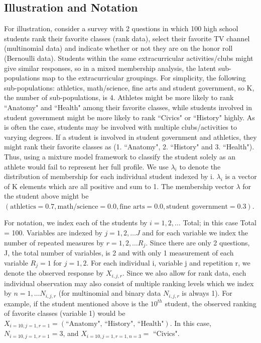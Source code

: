 \documentclass{article}\usepackage[]{graphicx}\usepackage[]{color}
\begin{document}
\subsection{Illustration and Notation}
For illustration, consider a survey with 2 questions in which 100 high school students rank their favorite classes (rank data), select their favorite TV channel (multinomial data) and indicate whether or not they are on the honor roll (Bernoulli data). Students within the same extracurricular activities/clubs might give similar responses, so in a mixed membership analysis, the latent sub-populations map to the extracurricular groupings. For simplicity, the following sub-populations: athletics, math/science, fine arts and student government, so K, the number of sub-populations, is 4. Athletes might be more likely to rank ``Anatomy" and ``Health" among their favorite classes, while students involved in student government might be more likely to rank ``Civics" or ``History" highly.  As is often the case, students may be involved with multiple clubs/activities to varying degrees. If a student is involved in student government and athletics, they might rank their favorite classes as (1. ``Anatomy", 2. ``History" and 3. ``Health"). Thus, using a mixture model framework to classify the student solely as an athlete would fail to represent her full profile. We use $\lambda_i$ to denote the distribution of membership for each individual student indexed by i. $\lambda_i$ is a vector of K elements which are all positive and sum to 1. The membership vector $\lambda$ for the student above might be $\left(\text{athletics} = 0.7, \text{math/science} = 0.0, \text{fine arts} = 0.0, \text{student government} = 0.3\right)$.

For notation, we index each of the students by $i = 1,2, \ldots$ Total; in this case Total = 100. Variables are indexed by $j = 1,2,\ldots J$ and for each variable we index the number of repeated measures by $r = 1,2,\ldots R_j$. Since there are only 2 questions, J, the total number of variables, is 2 and with only 1 measurement of each variable $R_j = 1$ for $j = 1,2$. For each individual i, variable j and repetition r, we denote the observed response by $X_{i,j,r}$. Since we also allow for rank data, each individual observation may also consist of multiple ranking levels which we index by $n = 1, \ldots N_{i,j,r}$ (for multinomial and binary data $N_{i,j,r}$ is always 1). For example, if the student mentioned above is the $10^{th}$ student, the observed ranking of favorite classes (variable 1) would be $X_{i = 10, j = 1, r = 1} = \left(\text{``Anatomy", ``History", ``Health"}\right)$. In this case, $N_{i = 10, j = 1, r = 1} = 3$, and $X_{i = 10,j = 1,r = 1,n = 3} =$ ``Civics".    
\end{document}
